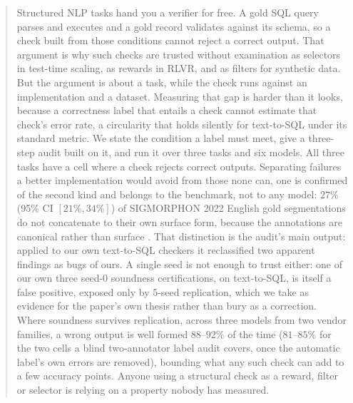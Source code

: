 \documentclass[11pt]{article}
\begin{document}
\begin{abstract}
Structured NLP tasks hand you a verifier for free. A gold SQL query parses and
executes and a gold record validates against its schema, so a check built from
those conditions cannot reject a correct output. That argument is why such
checks are trusted without examination as selectors in test-time scaling, as
rewards in RLVR, and as filters for synthetic data. But the argument is about a
task, while the check runs against an implementation and a dataset. Measuring
that gap is harder than it looks, because a correctness label that entails a
check cannot estimate that check's error rate, a circularity that holds silently
for text-to-SQL under its standard metric. We state the condition a label must
meet, give a three-step audit built on it, and run it over three tasks and six
models. All three tasks have a cell where a check rejects correct outputs. Separating failures a better implementation would avoid from those none can,
one is confirmed of the second kind and belongs to the benchmark, not to any
model: $27\%$ (95\% CI $[21\%,34\%]$) of SIGMORPHON 2022
English gold segmentations do not concatenate to their own surface form, because
the annotations are canonical rather than surface
\citep{cotterell2016canonical}. That distinction is the audit's main output: applied to our own text-to-SQL
checkers it reclassified two apparent findings as bugs of ours. A single
seed is not enough to trust either: one of our own three seed-0
soundness certifications, on text-to-SQL, is itself a false
positive, exposed only by 5-seed replication, which we take as
evidence for the paper's own thesis rather than bury as a correction.
Where soundness survives replication, across three models from two
vendor families, a wrong output is well
formed $88$--$92\%$ of the time ($81$--$85\%$ for the two cells a blind
two-annotator label audit covers, once the automatic label's own errors are
removed), bounding what any such check can add to a few accuracy points. Anyone
using a structural check as a reward, filter or selector is relying on a
property nobody has measured.
\end{abstract}

\end{document}
